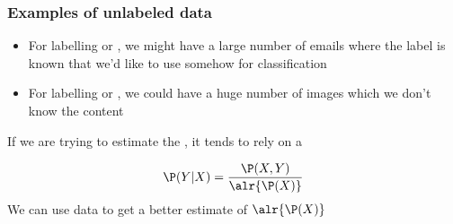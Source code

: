 \documentclass[12pt]{beamer}
\begin{document}
\begin{frame}[fragile]
\frametitle{Examples of unlabeled data}
\begin{itemize}
\item {} For labelling  or , we might have a large number
of emails where the label is known that we'd like to use somehow for classification
\item {} For labelling  or  , we could have a huge number of
images which we don't know the content


\end{itemize}
If we are trying to estimate the , it tends to rely on a 

\vsp
\[
\P(Y | X) = \frac{\P(X,Y)}{\alr{\P(X)}} 
\]
We can use  data to get a better estimate of $\alr{\P(X)}$

\end{frame}
%
%
%
%
\end{document}
